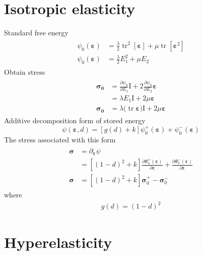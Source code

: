 \documentclass[12pt,3p]{article}
\numberwithin{equation}{section}
\begin{document}
\section{Isotropic elasticity}
Standard free energy
\begin{align}
\begin{split}
\psi_{0}(\boldsymbol{\varepsilon}) &= \frac{\lambda}{2} \operatorname{tr}^{2}[\boldsymbol{\varepsilon}] +\mu \operatorname{tr}\left[\boldsymbol{\varepsilon}^{2}\right] \\
\psi_{0}(\boldsymbol{\varepsilon}) &= \frac{\lambda}{2} E_1^2 + \mu E_2
\end{split}
\end{align}
Obtain stress 
\begin{align}
\begin{split}
\boldsymbol{\sigma_0} &= \frac{\partial \psi_{0}}{\partial E_1} \mathrm{I} 
				+ 2 \frac{\partial \psi_{0}}{\partial E_2 } \boldsymbol{\varepsilon} \\
				&= \lambda E_1 \mathrm{I} + 2 \mu \boldsymbol{\varepsilon} \\
\boldsymbol{\sigma_0} &= \lambda \big( \operatorname{tr} \boldsymbol{\varepsilon} \big) \mathrm{I} + 2 \mu \boldsymbol{\varepsilon}
\end{split}
\end{align}
Additive decomposition form of stored energy 
\begin{equation}
\psi(\boldsymbol{\varepsilon}, d)=[g(d)+k] \psi_{0}^{+}(\boldsymbol{\varepsilon})+\psi_{0}^{-}(\boldsymbol{\varepsilon})
\end{equation}
The stress associated with this form 
\begin{align}
\begin{split}
\boldsymbol{\sigma} &=\partial_{\boldsymbol{\varepsilon}} \psi \\
				&=\left[(1-d)^{2}+k\right] \frac{\partial \Psi_{0}^{+}(\boldsymbol{\varepsilon})}{\partial \boldsymbol{\varepsilon}}+\frac{\partial \Psi_{0}^{-}(\boldsymbol{\varepsilon})}{\partial \boldsymbol{\varepsilon}} \\
\boldsymbol{\sigma} &=\left[(1-d)^{2}+k\right] \boldsymbol{\sigma}_{0}^{+}-\boldsymbol{\sigma}_{0}^{-}
\end{split}
\end{align}
where 
\begin{align}
g(d) = (1-d)^2
\end{align}


\section{Hyperelasticity}
\end{document}
